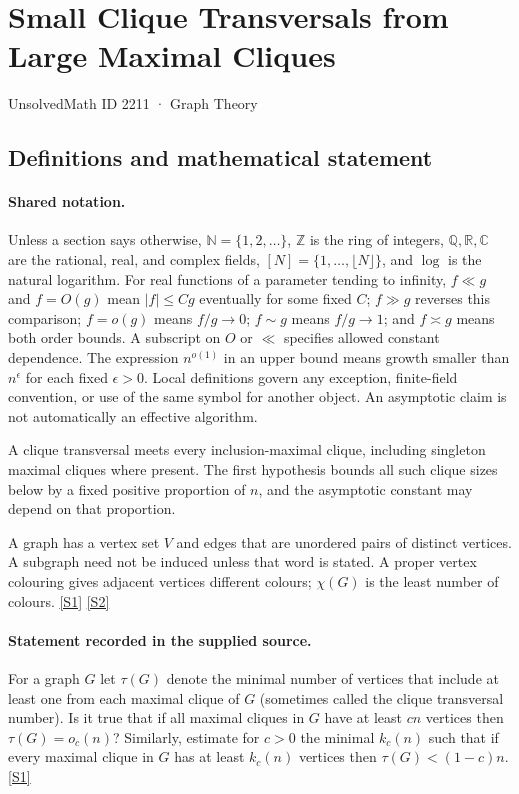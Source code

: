\documentclass[11pt,a4paper]{article}
\newcommand{\N}{\mathbb{N}}
\newcommand{\Z}{\mathbb{Z}}
\newcommand{\Q}{\mathbb{Q}}
\newcommand{\R}{\mathbb{R}}
\newcommand{\C}{\mathbb{C}}
\newcommand{\sref}[2]{\hyperlink{source:#1:#2}{[S#2]}}
\begin{document}

\setcounter{section}{2210}

\section{Small Clique Transversals from Large Maximal Cliques}\label{2211}

{\small\sffamily UnsolvedMath ID 2211 · Graph Theory}

\subsection{Definitions and mathematical statement}

\paragraph{Shared notation.}Unless a section says otherwise, $\N=\{1,2,\ldots\}$,
$\Z$ is the ring of integers, $\Q,\R,\C$ are the rational, real, and complex
fields, $[N]=\{1,\ldots,\lfloor N\rfloor\}$, and $\log$ is the natural
logarithm. For real functions of a parameter tending to infinity,
$f\ll g$ and $f=O(g)$ mean $|f|\leq Cg$ eventually for some fixed $C$;
$f\gg g$ reverses this comparison; $f=o(g)$ means $f/g\to0$;
$f\sim g$ means $f/g\to1$; and $f\asymp g$ means both order bounds.
A subscript on $O$ or $\ll$ specifies allowed constant dependence.
The expression $n^{o(1)}$ in an upper bound means growth smaller than
$n^\epsilon$ for each fixed $\epsilon>0$. Local definitions govern any
exception, finite-field convention, or use of the same symbol for another
object. An asymptotic claim is not automatically an effective algorithm.



A clique transversal meets every inclusion-maximal clique, including singleton maximal cliques where present. The first hypothesis bounds all such clique sizes below by a fixed positive proportion of $n$, and the asymptotic constant may depend on that proportion.

A graph has a vertex set $V$ and edges that are unordered pairs of distinct vertices. A subgraph need not be induced unless that word is stated. A proper vertex colouring gives adjacent vertices different colours; $\chi(G)$ is the least number of colours. \sref{2211}{1} \sref{2211}{2}

\paragraph{Statement recorded in the supplied source.}
For a graph $G$ let $\tau(G)$ denote the minimal number of vertices that include at least one from each maximal clique of $G$ (sometimes called the clique transversal number).
Is it true that if all maximal cliques in $G$ have at least $cn$ vertices then $\tau(G)=o_c(n)$?
Similarly, estimate for $c>0$ the minimal $k_c(n)$ such that if every maximal clique in $G$ has at least $k_c(n)$ vertices then $\tau(G)<(1-c)n$. \sref{2211}{1}
\end{document}
